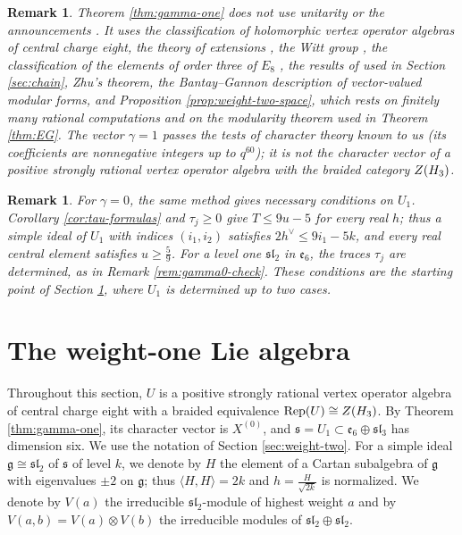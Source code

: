 \documentclass[leqno]{article}
\let\cal\relax
\newcommand{\cal}{\mathcal}
\renewcommand{\leq}{\ensuremath{\leqslant}}
\renewcommand{\geq}{\ensuremath{\geqslant}}
\newcommand{\ot}{\otimes}
\DeclareMathOperator{\Rep}{Rep}
\newtheorem{remark}[thm]{Remark}
\numberwithin{equation}{section}
\begin{document}
\begin{remark}\normalfont
\label{rem:gamma-one-hypotheses}
Theorem \ref{thm:gamma-one} does not use unitarity or the announcements \cite{Rie26,Hua26,Jia26}. It uses the classification of holomorphic vertex operator algebras of central charge eight, the theory of extensions \cite{HKL15,CKM22}, the Witt group \cite{DMNO13}, the classification of the elements of order three of $E_8$ \cite{Kac90}, the results of \cite{DoN99,DoM04,Mas14,ENO05} used in Section \ref{sec:chain}, Zhu's theorem, the Bantay--Gannon description of vector-valued modular forms, and Proposition \ref{prop:weight-two-space}, which rests on finitely many rational computations and on the modularity theorem used in Theorem \ref{thm:EG}. The vector $\gamma = 1$ passes the tests of character theory known to us (its coefficients are nonnegative integers up to $q^{60}$); it is not the character vector of a positive strongly rational vertex operator algebra with the braided category $Z(\cal H_3)$.
\end{remark}

\begin{remark}\normalfont
\label{rem:gamma-zero-constraints}
For $\gamma = 0$, the same method gives necessary conditions on $U_1$. Corollary \ref{cor:tau-formulas} and $\tau_j \geq 0$ give $T \leq 9u-5$ for every real $h$; thus a simple ideal of $U_1$ with indices $(i_1,i_2)$ satisfies $2h^\vee \leq 9i_1-5k$, and every real central element satisfies $u \geq \frac59$. For a level one $\mathfrak{sl}_2$ in $\mathfrak e_6$, the traces $\tau_j$ are determined, as in Remark \ref{rem:gamma0-check}. These conditions are the starting point of Section \ref{sec:weight-one-lie}, where $U_1$ is determined up to two cases.
\end{remark}

\section{The weight-one Lie algebra}
\label{sec:weight-one-lie}

Throughout this section, $U$ is a positive strongly rational vertex operator algebra of central charge eight with a braided equivalence $\Rep(U) \cong Z(\cal H_3)$. By Theorem \ref{thm:gamma-one}, its character vector is $X^{(0)}$, and $\mathfrak s = U_1 \subset \mathfrak e_6 \oplus \mathfrak{sl}_3$ has dimension six. We use the notation of Section \ref{sec:weight-two}. For a simple ideal $\mathfrak g \cong \mathfrak{sl}_2$ of $\mathfrak s$ of level $k$, we denote by $H$ the element of a Cartan subalgebra of $\mathfrak g$ with eigenvalues $\pm 2$ on $\mathfrak g$; thus $\langle H,H\rangle = 2k$ and $h = \frac{H}{\sqrt{2k}}$ is normalized. We denote by $V(a)$ the irreducible $\mathfrak{sl}_2$-module of highest weight $a$ and by $V(a,b) = V(a) \ot V(b)$ the irreducible modules of $\mathfrak{sl}_2 \oplus \mathfrak{sl}_2$.
\end{document}
